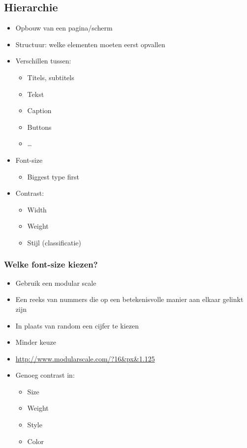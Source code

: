 \documentclass{article}
\begin{document}
\subsection{Hierarchie}
\begin{itemize}
    \item Opbouw van een pagina/scherm 
    \item Structuur: welke elementen moeten eerst opvallen
    \item Verschillen tussen:
    \begin{itemize}
        \item Titels, subtitels
        \item Tekst
        \item Caption
        \item Buttons
        \item \dots
    \end{itemize}
    \item Font-size
    \begin{itemize}
        \item Biggest type first
    \end{itemize}
    \item Contrast:
    \begin{itemize}
        \item Width
        \item Weight
        \item Stijl (classificatie)
    \end{itemize}
\end{itemize}

\subsubsection{Welke font-size kiezen?}
\begin{itemize}
    \item Gebruik een modular scale
    \item Een reeks van nummers die op een betekenisvolle manier aan elkaar gelinkt zijn
    \item In plaats van random een cijfer te kiezen
    \item Minder keuze 
    \item \url{http://www.modularscale.com/?16&px&1.125}
    \item Genoeg contrast in:
    \begin{itemize}
        \item Size
        \item Weight
        \item Style
        \item Color
    \end{itemize}
\end{itemize}
\end{document}
